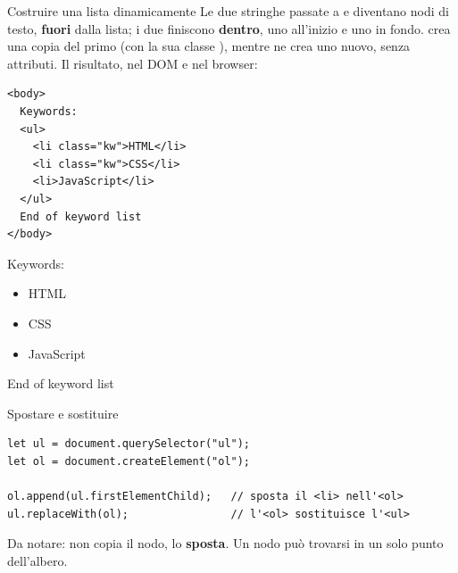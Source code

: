 \begin{esempio}{Costruire una lista dinamicamente}
Le due stringhe passate a  e  diventano nodi di testo,
\textbf{fuori} dalla lista; i due  finiscono \textbf{dentro}, uno
all'inizio e uno in fondo.  crea una copia del primo 
(con la sua classe ), mentre  ne crea uno nuovo,
senza attributi. Il risultato, nel DOM e nel browser:

\begin{affianco}[0.5][c]
\begin{lstlisting}[style=html, name=risultato.html]
<body>
  Keywords:
  <ul>
    <li class="kw">HTML</li>
    <li class="kw">CSS</li>
    <li>JavaScript</li>
  </ul>
  End of keyword list
</body>
\end{lstlisting}
\risultato
\begin{browser}
  Keywords:
  \begin{itemize}[leftmargin=18pt, itemsep=0pt, topsep=2pt]
    \item HTML
    \item CSS
    \item JavaScript
  \end{itemize}
  End of keyword list
\end{browser}
\end{affianco}
\end{esempio}

\begin{esempio}{Spostare e sostituire}
\begin{affianco}[0.55][c]
\begin{lstlisting}[style=js, name=sostituisci.js]
let ul = document.querySelector("ul");
let ol = document.createElement("ol");

ol.append(ul.firstElementChild);   // sposta il <li> nell'<ol>
ul.replaceWith(ol);                // l'<ol> sostituisce l'<ul>
\end{lstlisting}
\risultato
\begin{immagine}
\end{immagine}
\end{affianco}

Da notare:  non copia il nodo, lo \textbf{sposta}. Un nodo può
trovarsi in un solo punto dell'albero.
\end{esempio}

